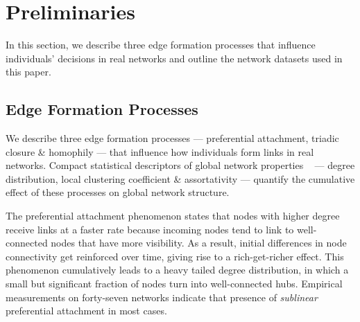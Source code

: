 
\section{Preliminaries}
\label{sec:Preliminaries}

In this section, we describe three edge formation processes that influence
individuals' decisions in real networks and outline the network datasets used in this paper.


\subsection{Edge Formation Processes} \label{sub:Structural Properties}

We describe three edge formation processes --- preferential attachment,
triadic closure \& homophily --- that influence how individuals form links in real
networks. Compact statistical descriptors of global network properties ~\cite{newman2010networks}
--- degree distribution, local clustering coefficient \& assortativity --- quantify the cumulative effect
of these processes on global network structure.


The preferential attachment phenomenon \cite{simon1955class,
barabasi1999emergence} states that nodes with higher degree receive links at a
faster rate because incoming nodes tend to link to well-connected nodes that
have more visibility. As a result, initial
differences in node connectivity get reinforced over time, giving rise to a
rich-get-richer effect. This phenomenon cumulatively leads to a heavy tailed
degree distribution, in which a small but significant fraction of nodes turn
into well-connected hubs. Empirical measurements on forty-seven networks
\cite{kunegis2013preferential} indicate that presence of \textit{sublinear}
preferential attachment in most cases.

